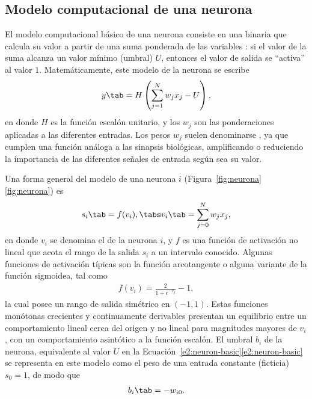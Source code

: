 %
%
\subsection{Modelo computacional de una neurona}
%
El modelo computacional básico de una neurona \cite{mlp1} consiste en
una  binaria que calcula su valor  a partir de una suma ponderada de las variables :
si el valor de la suma alcanza un valor mínimo (umbral) $U$, entonces
el valor de salida se ``activa'' al valor $1$.
Matemáticamente, este modelo de la neurona se escribe
%
\begin{align}\label{e2:neuron-basic}
  y \tab = H\left( \sum_{j=1}^{N} w_j x_j - U\right),
\end{align}
%
en donde $H$ es la función escalón unitario, y los  $w_j$ son
las ponderaciones aplicadas a las diferentes entradas.
Los pesos $w_j$ suelen denominarse , ya que
cumplen una función análoga a las sinapsis biológicas, amplificando o
reduciendo la importancia de las diferentes señales de entrada según
sea su valor.


Una forma general del modelo de una neurona $i$
(\iflatexml{}Figura~\ref{fig:neurona}\else\autoref{fig:neurona}\fi) es
%
\begin{align}\label{e2:neuron-general}
  s_i \tab = f(v_i), \tabs v_i \tab = \sum_{j=0}^N w_j x_j,
\end{align}
%
en donde $v_i$ se denomina el  de la neurona
$i$, y $f$ es una función de activación no lineal que acota el rango
de la salida $s_i$ a un intervalo conocido. Algunas funciones de
activación típicas son la función arcotangente o alguna variante de la
función sigmoidea, tal como
%
\begin{align}\label{e2:sigmoid-symmetric}
  f(v_i) = \frac{2}{1+e^{-v_j}}-1,
\end{align}
%
la cual posee un rango de salida simétrico en $(-1,1)$. Estas
funciones monótonas crecientes y continuamente derivables presentan un
equilibrio entre un comportamiento lineal cerca del origen y no lineal
para magnitudes mayores de $v_i$, con un comportamiento asintótico a
la función escalón. El umbral $b_i$ de la neurona, equivalente al
valor $U$ en la
\iflatexml{}Ecuación~\ref{e2:neuron-basic}\else\autoref{e2:neuron-basic}\fi{}
se representa en este modelo como el peso de una entrada constante
(ficticia) $s_0=1$, de modo que
%
\begin{align}
  b_i\tab=-w_{i0}.
\end{align}
%
